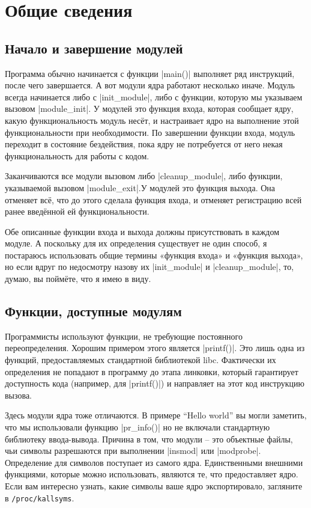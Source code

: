\documentclass[10pt, oneside]{book}
\begin{document}
\section{Общие сведения}
\subsection{Начало и завершение модулей}
\label{sec:module_init_exit}
Программа обычно начинается с функции \cpp|main()| выполняет ряд инструкций, после чего
завершается. А вот модули ядра работают несколько иначе. Модуль всегда начинается либо с \cpp|init_module|, либо с функции, которую мы указываем вызовом  \cpp|module_init|. У модулей это функция входа, которая сообщает ядру, какую функциональность модуль несёт, и настраивает ядро на выполнение этой функциональности при необходимости. По завершении функции входа, модуль переходит в состояние бездействия, пока ядру не потребуется от него некая функциональность для работы с кодом.

Заканчиваются все модули вызовом либо \cpp|cleanup_module|, либо функции, указываемой вызовом \cpp|module_exit|.У модулей это функция выхода. Она отменяет всё, что до этого сделала функция входа, и отменяет регистрацию всей ранее введённой ей функциональности.

Обе описанные функции входа и выхода должны присутствовать в каждом модуле. А поскольку для их определения существует не один способ, я постараюсь использовать общие термины «функция входа» и «функция выхода», но если вдруг по недосмотру назову их \cpp|init_module| и \cpp|cleanup_module|, то, думаю, вы поймёте, что я имею в виду.

\subsection{Функции, доступные модулям}
\label{sec:avail_func}
Программисты используют функции, не требующие постоянного переопределения.
Хорошим примером этого является \cpp|printf()|.
Это лишь одна из функций, предоставляемых стандартной библиотекой libc. Фактически их определения не попадают в программу до этапа линковки, который гарантирует доступность кода (например, для \cpp|printf()|) и направляет на этот код инструкцию вызова.

Здесь модули ядра тоже отличаются. В примере “Hello world” вы могли заметить, что мы использовали функцию \cpp|pr_info()| но не включали стандартную библиотеку ввода-вывода. Причина в том, что модули – это объектные файлы, чьи символы разрешаются при выполнении  \sh|insmod| или \sh|modprobe|.
Определение для символов поступает из самого ядра. Единственными внешними функциями, которые можно использовать, являются те, что предоставляет ядро. Если вам интересно узнать, какие символы ваше ядро экспортировало, загляните в \verb|/proc/kallsyms|.
\end{document}
